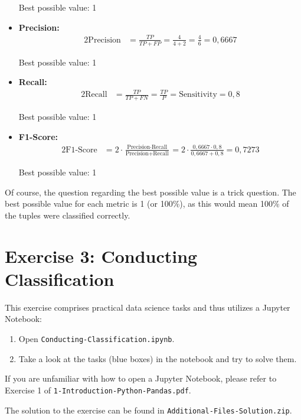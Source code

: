 \documentclass[
english,
smallborders
]{i6prcsht}
\begin{document}
\begin{solution}
\begin{itemize}
		      Best possible value: 1
		\item \textbf{Precision:}
		      \begin{alignat*}{2}
			      \text{Precision} & = \frac{TP}{TP + FP} = \frac{4}{4 + 2} = \frac{4}{6} = 0,6667
		      \end{alignat*}

		      Best possible value: 1
		\item \textbf{Recall:}
		      \begin{alignat*}{2}
			      \text{Recall} & = \frac{TP}{TP + FN} = \frac{TP}{P} = \text{Sensitivity} = 0,8
		      \end{alignat*}

		      Best possible value: 1
		\item \textbf{F1-Score:}
		      \begin{alignat*}{2}
			      \text{F1-Score} & = 2 \cdot \frac{\text{Precision} \cdot \text{Recall}}{\text{Precision} + \text{Recall}} = 2 \cdot \frac{0,6667 \cdot 0,8}{0,6667 + 0,8} = 0,7273
		      \end{alignat*}

		      Best possible value: 1
	\end{itemize}

	Of course, the question regarding the best possible value is a trick question. The best possible value for each metric is 1 (or 100\%), as this would mean 100\% of the tuples were classified correctly.


\end{solution}

\newpage

\section*{Exercise 3: Conducting Classification}

This exercise comprises practical data science tasks and thus utilizes a Jupyter Notebook:

\begin{enumerate}
	\item Open \texttt{Conducting-Classification.ipynb}.
	\item Take a look at the tasks (blue boxes) in the notebook and try to solve them.
\end{enumerate}

If you are unfamiliar with how to open a Jupyter Notebook, please refer to Exercise 1 of \texttt{1-Introduction-Python-Pandas.pdf}.

\begin{solution}
	The solution to the exercise can be found in \texttt{Additional-Files-Solution.zip}.
\end{solution}
\end{document}
